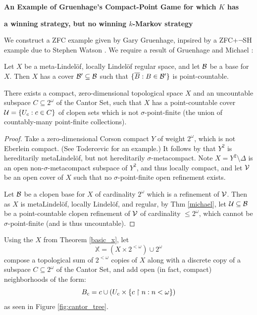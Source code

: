 





\centerline{\bf An Example of Gruenhage's Compact-Point Game for which $K$ has }
\centerline{\bf a winning strategy, but no winning $k$-Markov strategy}

We construct a ZFC example given by Gary Gruenhage, inpsired by a ZFC+$\lnot$SH example due to Stephen Watson \cite{Watson}. We require a result of Gruenhage and Michael \cite{Michael}:

\begin{theorem}\label{michael}
Let $X$ be a meta-Lindel\"of, locally Lindel\"of regular space, and let $\mathcal{B}$ be a base for $X$. Then $X$ has a cover $\mathcal{B}'\subseteq\mathcal{B}$ such that $\{\overline{B}:B\in\mathcal{B}'\}$ is point-countable.
\end{theorem}

\begin{theorem}\label{basic_x}
There exists a compact, zero-dimensional topological space $X$ and an uncountable subspace $C\subseteq 2^\omega$ of the Cantor Set, such that $X$ has a point-countable cover $\mathcal{U} = \{U_c : c \in C\}$ of clopen sets which is not $\sigma$-point-finite (the union of countably-many point-finite collections).
\end{theorem}

\begin{proof}
Take a zero-dimensional Corson compact $Y$ of weight $2^\omega$, which is not Eberlein compact. (See Todercevic \cite{Todercevic} for an example.) It follows by \cite{G1} that $Y^2$ is hereditarily metaLindel\"of, but not hereditarily $\sigma$-metacompact. Note $X=Y^2\setminus \Delta$ is an open non-$\sigma$-metacompact subspace of $Y^2$, and thus locally compact, and let $\mathcal{V}$ be an open cover of $X$ such that no $\sigma$-point-finite open refinement exists.

Let $\mathcal{B}$ be a clopen base for $X$ of cardinality $2^\omega$ which is a refinement of $\mathcal{V}$.  Then as $X$ is metaLindel\"of, locally Lindel\"of, and regular, by Thm \ref{michael}, let $\mathcal{U}\subseteq \mathcal{B}$ be a point-countable clopen refinement of $\mathcal{V}$ of cardinality $\leq 2^\omega$, which cannot be $\sigma$-point-finite (and is thus uncountable).
\end{proof}

\begin{definition}
Using the $X$ from Theorem \ref{basic_x}, let \[\mathbb{X} = (X \times 2^{<\omega}) \cup 2^\omega\] compose a topological sum of $2^{<\omega}$ copies of $X$ along with a discrete copy of a subspace $C \subseteq 2^\omega$ of the Cantor Set, and add open (in fact, compact) neighborhoods of the form: 
  \[
    B_c = c \cup (U_c \times \{c\restriction n : n < \omega\})
  \]
as seen in Figure \ref{fig:cantor_tree}.
\end{definition}

